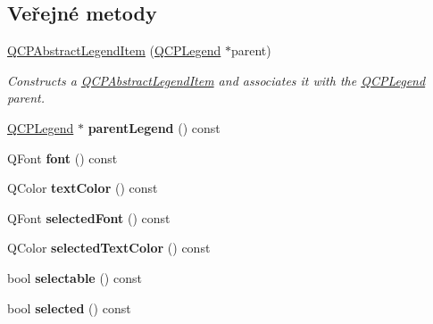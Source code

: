 \subsection*{Veřejné metody}
\begin{DoxyCompactItemize}
\item 
\hyperlink{classQCPAbstractLegendItem_afaff87610e8da0fa238ecf552872d774}{Q\+C\+P\+Abstract\+Legend\+Item} (\hyperlink{classQCPLegend}{Q\+C\+P\+Legend} $\ast$parent)
\begin{DoxyCompactList}\small\item\em Constructs a \hyperlink{classQCPAbstractLegendItem}{Q\+C\+P\+Abstract\+Legend\+Item} and associates it with the \hyperlink{classQCPLegend}{Q\+C\+P\+Legend} {\itshape parent}. \end{DoxyCompactList}\item 
\hypertarget{classQCPAbstractLegendItem_afcd683e43058f99a47d6546eedffc5c1}{}\hyperlink{classQCPLegend}{Q\+C\+P\+Legend} $\ast$ {\bfseries parent\+Legend} () const \label{classQCPAbstractLegendItem_afcd683e43058f99a47d6546eedffc5c1}

\item 
\hypertarget{classQCPAbstractLegendItem_ae476404706638d84fadc01021df2b19e}{}Q\+Font {\bfseries font} () const \label{classQCPAbstractLegendItem_ae476404706638d84fadc01021df2b19e}

\item 
\hypertarget{classQCPAbstractLegendItem_a444caef8565ac8d8653269f14d82b42d}{}Q\+Color {\bfseries text\+Color} () const \label{classQCPAbstractLegendItem_a444caef8565ac8d8653269f14d82b42d}

\item 
\hypertarget{classQCPAbstractLegendItem_afccfe665eb8483cec924a9c0a53ddf2b}{}Q\+Font {\bfseries selected\+Font} () const \label{classQCPAbstractLegendItem_afccfe665eb8483cec924a9c0a53ddf2b}

\item 
\hypertarget{classQCPAbstractLegendItem_a076db1717257b82875b12a15ecf99ba3}{}Q\+Color {\bfseries selected\+Text\+Color} () const \label{classQCPAbstractLegendItem_a076db1717257b82875b12a15ecf99ba3}

\item 
\hypertarget{classQCPAbstractLegendItem_a0a0205f33f37edae50826c24cb8f1983}{}bool {\bfseries selectable} () const \label{classQCPAbstractLegendItem_a0a0205f33f37edae50826c24cb8f1983}

\item 
\hypertarget{classQCPAbstractLegendItem_ac776e68e3367704452131c6aa9908bb9}{}bool {\bfseries selected} () const \label{classQCPAbstractLegendItem_ac776e68e3367704452131c6aa9908bb9}


\end{DoxyCompactItemize}
